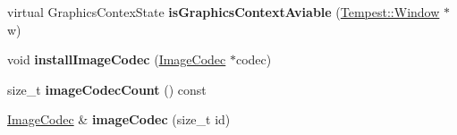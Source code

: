 \begin{DoxyCompactItemize}
\item 
\hypertarget{class_tempest_1_1_system_a_p_i_afae96242e0856066eaceb9404bd35409}{virtual Graphics\+Contex\+State {\bfseries is\+Graphics\+Context\+Aviable} (\hyperlink{class_tempest_1_1_window}{Tempest\+::\+Window} $\ast$w)}\label{class_tempest_1_1_system_a_p_i_afae96242e0856066eaceb9404bd35409}

\item 
\hypertarget{class_tempest_1_1_system_a_p_i_a8175e72ff3e355ae3897c1b74d6e4a75}{void {\bfseries install\+Image\+Codec} (\hyperlink{class_tempest_1_1_image_codec}{Image\+Codec} $\ast$codec)}\label{class_tempest_1_1_system_a_p_i_a8175e72ff3e355ae3897c1b74d6e4a75}

\item 
\hypertarget{class_tempest_1_1_system_a_p_i_af4c4284f6158a53dd271d194e30c9101}{size\+\_\+t {\bfseries image\+Codec\+Count} () const }\label{class_tempest_1_1_system_a_p_i_af4c4284f6158a53dd271d194e30c9101}

\item 
\hypertarget{class_tempest_1_1_system_a_p_i_ab0e42918501d7602aa1e8ea626053652}{\hyperlink{class_tempest_1_1_image_codec}{Image\+Codec} \& {\bfseries image\+Codec} (size\+\_\+t id)}\label{class_tempest_1_1_system_a_p_i_ab0e42918501d7602aa1e8ea626053652}

\end{DoxyCompactItemize}
